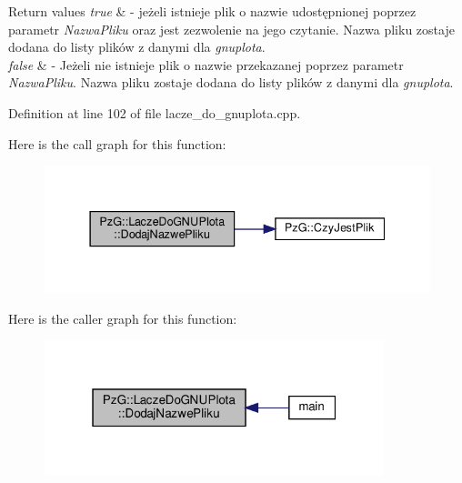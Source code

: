 \begin{DoxyRetVals}{Return values}
{\em true} & -\/ jeżeli istnieje plik o nazwie udostępnionej poprzez parametr {\itshape Nazwa\+Pliku} oraz jest zezwolenie na jego czytanie. Nazwa pliku zostaje dodana do listy plików z danymi dla {\itshape gnuplota}. \\
\hline
{\em false} & -\/ Jeżeli nie istnieje plik o nazwie przekazanej poprzez parametr {\itshape Nazwa\+Pliku}. Nazwa pliku zostaje dodana do listy plików z danymi dla {\itshape gnuplota}. \\
\hline
\end{DoxyRetVals}


Definition at line 102 of file lacze\+\_\+do\+\_\+gnuplota.\+cpp.

Here is the call graph for this function\+:\nopagebreak
\begin{figure}[H]
\begin{center}
\leavevmode
\includegraphics[width=337pt]{class_pz_g_1_1_lacze_do_g_n_u_plota_a34bd48f57c0fd69c12bf4127a1cacd8f_cgraph}
\end{center}
\end{figure}
Here is the caller graph for this function\+:\nopagebreak
\begin{figure}[H]
\begin{center}
\leavevmode
\includegraphics[width=280pt]{class_pz_g_1_1_lacze_do_g_n_u_plota_a34bd48f57c0fd69c12bf4127a1cacd8f_icgraph}
\end{center}
\end{figure}
\mbox{\label{class_pz_g_1_1_lacze_do_g_n_u_plota_a25585ec3f1bd3b6bf42f374c38b8d237}} 
